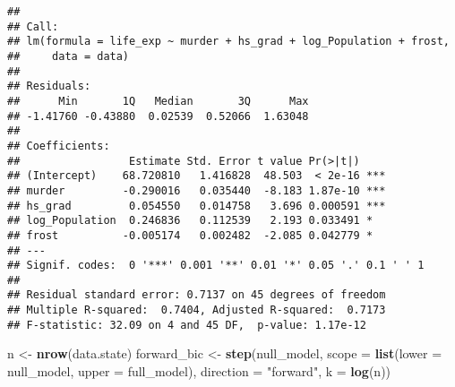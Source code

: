 \documentclass[
]{article}
\newenvironment{Shaded}{\begin{snugshade}}{\end{snugshade}}
\newcommand{\AttributeTok}[1]{\textcolor[rgb]{0.13,0.29,0.53}{#1}}
\newcommand{\FunctionTok}[1]{\textcolor[rgb]{0.13,0.29,0.53}{\textbf{#1}}}
\newcommand{\NormalTok}[1]{#1}
\newcommand{\OtherTok}[1]{\textcolor[rgb]{0.56,0.35,0.01}{#1}}
\newcommand{\StringTok}[1]{\textcolor[rgb]{0.31,0.60,0.02}{#1}}
\begin{document}
\begin{verbatim}
## 
## Call:
## lm(formula = life_exp ~ murder + hs_grad + log_Population + frost, 
##     data = data)
## 
## Residuals:
##      Min       1Q   Median       3Q      Max 
## -1.41760 -0.43880  0.02539  0.52066  1.63048 
## 
## Coefficients:
##                 Estimate Std. Error t value Pr(>|t|)    
## (Intercept)    68.720810   1.416828  48.503  < 2e-16 ***
## murder         -0.290016   0.035440  -8.183 1.87e-10 ***
## hs_grad         0.054550   0.014758   3.696 0.000591 ***
## log_Population  0.246836   0.112539   2.193 0.033491 *  
## frost          -0.005174   0.002482  -2.085 0.042779 *  
## ---
## Signif. codes:  0 '***' 0.001 '**' 0.01 '*' 0.05 '.' 0.1 ' ' 1
## 
## Residual standard error: 0.7137 on 45 degrees of freedom
## Multiple R-squared:  0.7404, Adjusted R-squared:  0.7173 
## F-statistic: 32.09 on 4 and 45 DF,  p-value: 1.17e-12
\end{verbatim}

\begin{Shaded}
\begin{Highlighting}[]
\NormalTok{n }\OtherTok{\textless{}{-}} \FunctionTok{nrow}\NormalTok{(data.state) }
\NormalTok{forward\_bic }\OtherTok{\textless{}{-}} \FunctionTok{step}\NormalTok{(null\_model, }
                    \AttributeTok{scope =} \FunctionTok{list}\NormalTok{(}\AttributeTok{lower =}\NormalTok{ null\_model, }\AttributeTok{upper =}\NormalTok{ full\_model), }
                    \AttributeTok{direction =} \StringTok{"forward"}\NormalTok{, }
                    \AttributeTok{k =} \FunctionTok{log}\NormalTok{(n)) }
\end{Highlighting}
\end{Shaded}
\end{document}
